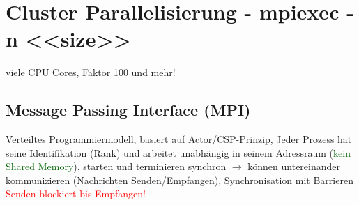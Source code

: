 \section{Cluster Parallelisierung - mpiexec -n <<size>>}

viele CPU Cores, Faktor 100 und mehr!

\subsection{Message Passing Interface (MPI)}

Verteiltes Programmiermodell, basiert auf Actor/CSP-Prinzip, Jeder Prozess hat seine Identifikation (Rank) und arbeitet unabhängig in seinem Adressraum (\textcolor{darkGreen}{kein Shared Memory}), starten und terminieren synchron $\rightarrow$ können untereinander kommunizieren (Nachrichten Senden/Empfangen), Synchronisation mit Barrieren \textcolor{red}{Senden blockiert bis Empfangen!}



